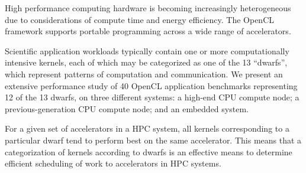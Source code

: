 \documentclass[../document.tex]{subfiles}
\begin{document}
High performance computing hardware is becoming increasingly heterogeneous due to considerations of compute time and energy efficiency.
The OpenCL framework supports portable programming across a wide range of accelerators.

Scientific application workloads typically contain one or more computationally intensive kernels, each of which may be categorized as one of the 13 ``dwarfs'', which represent patterns of computation and communication.
We present an extensive performance study of 40 OpenCL application benchmarks representing 12 of the 13 dwarfs, on three different systems: a high-end CPU compute node; a previous-generation CPU compute node; and an embedded system.

For a given set of accelerators in a HPC system, all kernels corresponding to a particular dwarf tend to perform best on the same accelerator.
This means that a categorization of kernels according to dwarfs is an effective means to determine efficient scheduling of work to accelerators in HPC systems.

\end{document}
